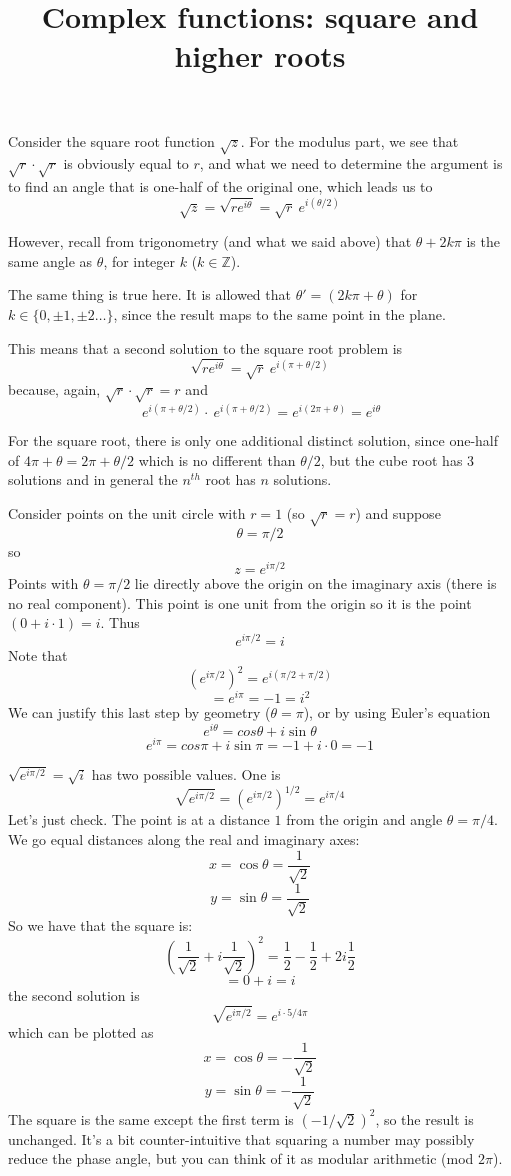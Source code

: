 \documentclass[11pt, oneside]{article}   	%
\title{Complex functions:  square and higher roots}
\date{}							%
\begin{document}
\maketitle
\Large
Consider the square root function $\sqrt{z}$.  For the modulus part, we see that $\sqrt{r} \cdot \sqrt{r}$ is obviously equal to $r$, and what we need to determine the argument is to find an angle that is one-half of the original one, which leads us to
\[ \sqrt{z} = \sqrt{re^{i\theta}} = \sqrt{r} \ e^{i (\theta/2)} \]

However, recall from trigonometry (and what we said above) that $\theta + 2k \pi$ is the same angle as $\theta$, for integer $k$ ($k \in \mathbb{Z}$).

The same thing is true here.  It is allowed that $\theta ' = (2k \pi + \theta)$ for $k \in \{ 0, \pm 1, \pm 2 \dots \}$, since the result maps to the same point in the plane.

This means that a second solution to the square root problem is
\[ \sqrt{re^{i\theta}} = \sqrt{r} \ e^{i (\pi + \theta/2)} \]
because, again, $\sqrt{r} \cdot \sqrt{r} = r$ and
\[ \ e^{i (\pi + \theta/2)} \cdot \ e^{i (\pi + \theta/2)} = e^{i (2\pi + \theta)} = e^{i\theta} \]

For the square root, there is only one additional distinct solution, since one-half of $4 \pi + \theta = 2 \pi + \theta/2$ which is no different than $\theta/2$, but the cube root has 3 solutions and in general the $n^{th}$ root has $n$ solutions.

Consider points on the unit circle with $r=1$ (so $\sqrt{r} = r$) and suppose
\[ \theta = \pi/2 \]
so
\[ z = e^{i \pi/2} \]
Points with $\theta = \pi/2$ lie directly above the origin on the imaginary axis (there is no real component).  This point is one unit from the origin so it is the point $(0 + i \cdot 1) = i$.  Thus
\[ e^{i \pi/2} = i \]
Note that
\[ (e^{i \pi/2})^2 = e^{i (\pi/2 + \pi/2)}\]
\[ = e^{i\pi} = -1 = i^2 \]
We can justify this last step by geometry ($\theta = \pi$), or by using Euler's equation
\[ e^{i\theta} = cos \theta + i \sin \theta \]
\[ e^{i\pi} =  cos \pi + i \sin \pi = - 1 + i \cdot 0 = -1 \]

$\sqrt{e^{i \pi/2}} = \sqrt{i}$ has two possible values.  One is
\[ \sqrt{e^{i\pi/2}}  = (e^{i\pi/2})^{1/2} = e^{i\pi/4} \]
Let's just check.  The point is at a distance $1$ from the origin and angle $\theta = \pi/4$.  We go equal distances along the real and imaginary axes:
\[ x = \cos \theta = \frac{1}{\sqrt{2}} \]
\[ y = \sin \theta = \frac{1}{\sqrt{2}} \]
So we have that the square is:
\[ (\frac{1}{\sqrt{2}} + i \frac{1}{\sqrt{2}} )^2 = \frac{1}{2} - \frac{1}{2} + 2 i \frac{1}{2} \]
\[ = 0 + i = i \]
the second solution is
\[ \sqrt{e^{i\pi/2}}  = e^{i \cdot 5/4 \pi} \]
which can be plotted as
\[ x = \cos \theta = -\frac{1}{\sqrt{2}} \]
\[ y = \sin \theta = -\frac{1}{\sqrt{2}} \]
The square is the same except the first term is $(- 1/\sqrt{2})^2$, so the result is unchanged.  It's a bit counter-intuitive that squaring a number may possibly reduce the phase angle, but you can think of it as modular arithmetic (mod $2 \pi$).
\end{document}

